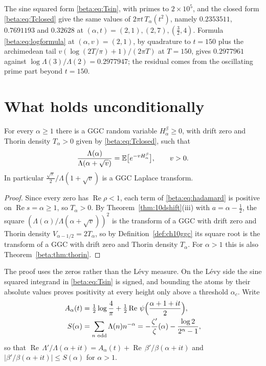 The sine squared form \eqref{beta:eq:Tsin}, with primes to $2\times10^5$, and the closed form \eqref{beta:eq:Tclosed} give the same values of $2\pi t\,T_\alpha(t^2)$, namely $0.2353511$, $0.7691193$ and $0.32628$ at $(\alpha,t)=(2,1),(2,7),(\tfrac32,4)$. Formula \eqref{beta:eq:logformula} at $(\alpha,v)=(2,1)$, by quadrature to $t=150$ plus the archimedean tail $v(\log(2T/\pi)+1)/(2\pi T)$ at $T=150$, gives $0.2977961$ against $\log\Lambda(3)/\Lambda(2)=0.2977947$; the residual comes from the oscillating prime part beyond $t=150$.


\section{What holds unconditionally}\label{beta:sec:uncond}

\begin{theorem}\label{beta:thm:uncond}
For every $\alpha\ge1$ there is a GGC random variable $H^\beta_\alpha\ge0$, with drift zero and Thorin density $T_\alpha>0$ given by \eqref{beta:eq:Tclosed}, such that
\[
\frac{\Lambda(\alpha)}{\Lambda(\alpha+\sqrt v)}=\mathbb{E}\bigl[e^{-vH^\beta_\alpha}\bigr],\qquad v>0.
\]
In particular $\tfrac{\sqrt\pi}{2}\big/\Lambda(1+\sqrt v)$ is a GGC Laplace transform.
\end{theorem}

\begin{proof}
Since every zero has $\operatorname{Re}\rho<1$, each term of \eqref{beta:eq:hadamard} is positive on $\operatorname{Re} s=\alpha\ge1$, so $T_\alpha>0$. By Theorem~\ref{thm:10dshift}(iii) with $a=\alpha-\frac12$, the square $(\Lambda(\alpha)/\Lambda(\alpha+\sqrt v))^2$ is the transform of a GGC with drift zero and Thorin density $V_{\alpha-1/2}=2T_\alpha$, so by Definition~\ref{def:ch10ggc} its square root is the transform of a GGC with drift zero and Thorin density $T_\alpha$. For $\alpha>1$ this is also Theorem~\ref{beta:thm:thorin}.
\end{proof}

The proof uses the zeros rather than the L\'evy measure. On the L\'evy side the sine squared integrand in \eqref{beta:eq:Tsin} is signed, and bounding the atoms by their absolute values proves positivity at every height only above a threshold $\alpha_c$. Write
\begin{align}
A_\alpha(t)&=\tfrac12\log\frac4\pi+\tfrac12\operatorname{Re}\,\psi\Bigl(\frac{\alpha+1+it}{2}\Bigr),\notag\\
S(\alpha)&=\sum_{n\text{ odd}}\Lambda(n)n^{-\alpha}=-\frac{\zeta'}{\zeta}(\alpha)-\frac{\log2}{2^\alpha-1},\label{beta:eq:AS}
\end{align}
so that $\operatorname{Re}\,\Lambda'/\Lambda(\alpha+it)=A_\alpha(t)+\operatorname{Re}\,\beta'/\beta(\alpha+it)$ and $|\beta'/\beta(\alpha+it)|\le S(\alpha)$ for $\alpha>1$.

